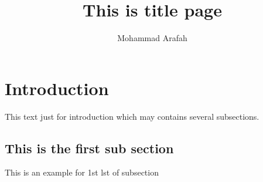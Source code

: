 \documentclass{article} %
\title{This is title page}
\author{Mohammad Arafah}
\begin{document}
\maketitle
\section{Introduction}
This text just for introduction which may contains several subsections.
\subsection{This is the first sub section}
This is an example for 1st lst of subsection
\end{document}
